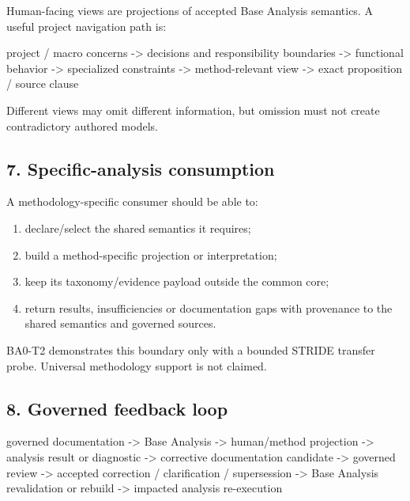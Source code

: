 \documentclass[
  10pt,
  a4paper,
]{article}
\newenvironment{Shaded}{}{}
\newcommand{\NormalTok}[1]{#1}
\providecommand{\tightlist}{%
  \setlength{\itemsep}{0pt}\setlength{\parskip}{0pt}}
\begin{document}
Human-facing views are projections of accepted Base Analysis semantics.
A useful project navigation path is:

\begin{Shaded}
\begin{Highlighting}[]
\NormalTok{project / macro concerns}
\NormalTok{        {-}\textgreater{} decisions and responsibility boundaries}
\NormalTok{        {-}\textgreater{} functional behavior}
\NormalTok{        {-}\textgreater{} specialized constraints}
\NormalTok{        {-}\textgreater{} method{-}relevant view}
\NormalTok{        {-}\textgreater{} exact proposition / source clause}
\end{Highlighting}
\end{Shaded}

Different views may omit different information, but omission must not
create contradictory authored models.

\subsection{7. Specific-analysis
consumption}\label{7-specific-analysis-consumption}

A methodology-specific consumer should be able to:

\begin{enumerate}
\def\labelenumi{\arabic{enumi}.}
\tightlist
\item
  declare/select the shared semantics it requires;
\item
  build a method-specific projection or interpretation;
\item
  keep its taxonomy/evidence payload outside the common core;
\item
  return results, insufficiencies or documentation gaps with provenance
  to the shared semantics and governed sources.
\end{enumerate}

BA0-T2 demonstrates this boundary only with a bounded STRIDE transfer
probe. Universal methodology support is not claimed.

\subsection{8. Governed feedback loop}\label{8-governed-feedback-loop}

\begin{Shaded}
\begin{Highlighting}[]
\NormalTok{governed documentation}
\NormalTok{ {-}\textgreater{} Base Analysis}
\NormalTok{ {-}\textgreater{} human/method projection}
\NormalTok{ {-}\textgreater{} analysis result or diagnostic}
\NormalTok{ {-}\textgreater{} corrective documentation candidate}
\NormalTok{ {-}\textgreater{} governed review}
\NormalTok{ {-}\textgreater{} accepted correction / clarification / supersession}
\NormalTok{ {-}\textgreater{} Base Analysis revalidation or rebuild}
\NormalTok{ {-}\textgreater{} impacted analysis re{-}execution}
\end{Highlighting}
\end{Shaded}
\end{document}
